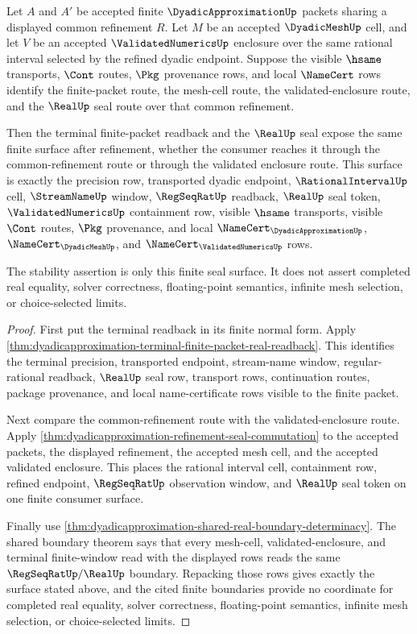 \begin{theorem}
\label{thm:dyadicapproximation-finite-packet-real-seal-stability}
Let $A$ and $A'$ be accepted finite $\DyadicApproximationUp$ packets sharing a
displayed common refinement $R$. Let $M$ be an accepted $\DyadicMeshUp$ cell,
and let $V$ be an accepted $\ValidatedNumericsUp$ enclosure over the same
rational interval selected by the refined dyadic endpoint. Suppose the visible
$\hsame$ transports, $\Cont$ routes, $\Pkg$ provenance rows, and local
$\NameCert$ rows identify the finite-packet route, the mesh-cell route, the
validated-enclosure route, and the $\RealUp$ seal route over that common
refinement.

Then the terminal finite-packet readback and the $\RealUp$ seal expose the same
finite surface after refinement, whether the consumer reaches it through the
common-refinement route or through the validated enclosure route. This surface
is exactly the precision row, transported dyadic endpoint,
$\RationalIntervalUp$ cell, $\StreamNameUp$ window, $\RegSeqRatUp$ readback,
$\RealUp$ seal token, $\ValidatedNumericsUp$ containment row, visible
$\hsame$ transports, visible $\Cont$ routes, $\Pkg$ provenance, and local
$\NameCert_{\DyadicApproximationUp}$, $\NameCert_{\DyadicMeshUp}$, and
$\NameCert_{\ValidatedNumericsUp}$ rows.

The stability assertion is only this finite seal surface. It does not assert
completed real equality, solver correctness, floating-point semantics,
infinite mesh selection, or choice-selected limits.
\end{theorem}
\begin{proof}
First put the terminal readback in its finite normal form. Apply
\autoref{thm:dyadicapproximation-terminal-finite-packet-real-readback}. This
identifies the terminal precision, transported endpoint, stream-name window,
regular-rational readback, $\RealUp$ seal row, transport rows, continuation
routes, package provenance, and local name-certificate rows visible to the
finite packet.

Next compare the common-refinement route with the validated-enclosure route.
Apply \autoref{thm:dyadicapproximation-refinement-seal-commutation} to the
accepted packets, the displayed refinement, the accepted mesh cell, and the
accepted validated enclosure. This places the rational interval cell,
containment row, refined endpoint, $\RegSeqRatUp$ observation window, and
$\RealUp$ seal token on one finite consumer surface.

Finally use
\autoref{thm:dyadicapproximation-shared-real-boundary-determinacy}. The shared
boundary theorem says that every mesh-cell, validated-enclosure, and terminal
finite-window read with the displayed rows reads the same
$\RegSeqRatUp/\RealUp$ boundary. Repacking those rows gives exactly the
surface stated above, and the cited finite boundaries provide no coordinate for
completed real equality, solver correctness, floating-point semantics,
infinite mesh selection, or choice-selected limits.
\end{proof}
